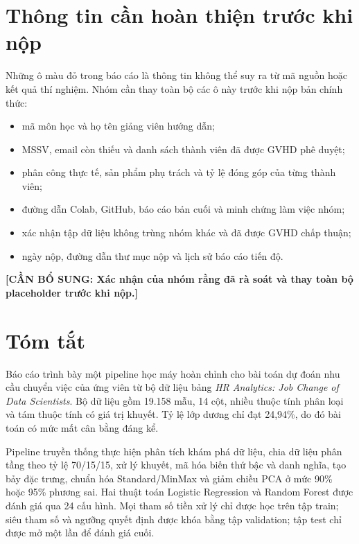 \documentclass[12pt,a4paper,oneside]{report}
\newcommand{\placeholder}[1]{%
  \colorbox{placeholderbg}{\textcolor{placeholderred}{\textbf{[CẦN BỔ SUNG: #1]}}}%
}
\begin{document}

\chapter*{Thông tin cần hoàn thiện trước khi nộp}

Những ô màu đỏ trong báo cáo là thông tin không thể suy ra từ mã nguồn hoặc kết quả thí nghiệm. Nhóm cần thay toàn bộ các ô này trước khi nộp bản chính thức:

\begin{itemize}
  \item mã môn học và họ tên giảng viên hướng dẫn;
  \item MSSV, email còn thiếu và danh sách thành viên đã được GVHD phê duyệt;
  \item phân công thực tế, sản phẩm phụ trách và tỷ lệ đóng góp của từng thành viên;
  \item đường dẫn Colab, GitHub, báo cáo bản cuối và minh chứng làm việc nhóm;
  \item xác nhận tập dữ liệu không trùng nhóm khác và đã được GVHD chấp thuận;
  \item ngày nộp, đường dẫn thư mục nộp và lịch sử báo cáo tiến độ.
\end{itemize}

\noindent\placeholder{Xác nhận của nhóm rằng đã rà soát và thay toàn bộ placeholder trước khi nộp.}

\chapter*{Tóm tắt}

Báo cáo trình bày một pipeline học máy hoàn chỉnh cho bài toán dự đoán nhu cầu chuyển việc của ứng viên từ bộ dữ liệu bảng \textit{HR Analytics: Job Change of Data Scientists}. Bộ dữ liệu gồm 19.158 mẫu, 14 cột, nhiều thuộc tính phân loại và tám thuộc tính có giá trị khuyết. Tỷ lệ lớp dương chỉ đạt 24,94\%, do đó bài toán có mức mất cân bằng đáng kể.

Pipeline truyền thống thực hiện phân tích khám phá dữ liệu, chia dữ liệu phân tầng theo tỷ lệ 70/15/15, xử lý khuyết, mã hóa biến thứ bậc và danh nghĩa, tạo bảy đặc trưng, chuẩn hóa Standard/MinMax và giảm chiều PCA ở mức 90\% hoặc 95\% phương sai. Hai thuật toán Logistic Regression và Random Forest được đánh giá qua 24 cấu hình. Mọi tham số tiền xử lý chỉ được học trên tập train; siêu tham số và ngưỡng quyết định được khóa bằng tập validation; tập test chỉ được mở một lần để đánh giá cuối.
\end{document}
